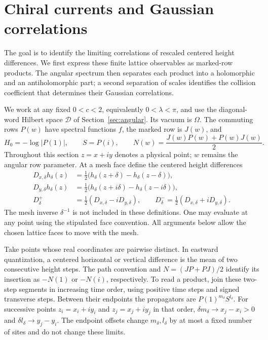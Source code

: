 \section{Chiral currents and Gaussian correlations}\label{sec:chiral}

The goal is to identify the limiting correlations of rescaled centered
height differences. We first express these finite lattice observables as marked-row
products. The angular spectrum then separates each product into a
holomorphic and an antiholomorphic part; a second separation of scales
identifies the collision coefficient that determines their Gaussian
correlations.

We work at any fixed $0<c<2$, equivalently $0<\lambda<\pi$,
and use the diagonal-word
Hilbert space $\mathcal D$ of Section~\ref{sec:angular}. Its vacuum is
$\Omega$. The commuting rows $P(w)$ have spectral functions $f$, the marked
row is $J(w)$, and
\[
 H_0=-\log|P(1)|,\qquad S=P(i),\qquad
 N(w)=\frac{J(w)P(w)+P(w)J(w)}2.
\]
Throughout this section $z=x+iy$ denotes a physical point; $w$ remains
the angular row parameter. At a mesh face define the centered height differences
\begin{align*}
 D_{x,\delta}h_\delta(z)
   &=\tfrac12\bigl(h_\delta(z+\delta)-h_\delta(z-\delta)\bigr),\\
 D_{y,\delta}h_\delta(z)
   &=\tfrac12\bigl(h_\delta(z+i\delta)-h_\delta(z-i\delta)\bigr),\\
 D_\delta^+&=\tfrac12(D_{x,\delta}-iD_{y,\delta}),\qquad
 D_\delta^-=\tfrac12(D_{x,\delta}+iD_{y,\delta}).
\end{align*}
The mesh inverse $\delta^{-1}$ is not included in these definitions.
One may evaluate at any point using the stipulated face convention.
All arguments below allow the chosen lattice faces to move with the mesh.

Take points whose real coordinates are pairwise distinct. In eastward
quantization, a centered horizontal or vertical difference is the mean of
two consecutive height steps. The path convention and $N=(JP+PJ)/2$
identify its insertion as $-N(1)$ or $-N(i)$, respectively. To read a
product, join these two-step segments in increasing time order, using
positive time steps and signed transverse steps. Between their endpoints
the propagators are $P(1)^{m_\delta}S^{l_\delta}$. For successive points
$z_i=x_i+iy_i$ and $z_j=x_j+iy_j$ in that order,
$\delta m_\delta\to x_j-x_i>0$ and
$\delta l_\delta\to y_j-y_i$. The endpoint offsets change
$m_\delta,l_\delta$ by at most a fixed number of sites and do not
change these limits.

